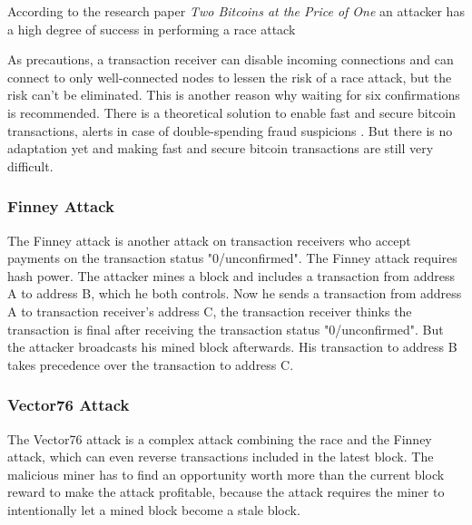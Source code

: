 According to the research paper \textit{Two Bitcoins at the Price of One} \cite{Karame12twobitcoins} an attacker has a high degree of success in performing a race attack 

As precautions, a transaction receiver can disable incoming connections and can connect to only well-connected nodes to lessen the risk of a race attack, but the risk can't be eliminated. This is another reason why waiting for six confirmations is recommended. There is a theoretical solution to enable fast and secure bitcoin transactions, alerts in case of double-spending fraud suspicions \cite{Karame12twobitcoins}. But there is no adaptation yet and making fast and secure bitcoin transactions are still very difficult.

\subsubsection{Finney Attack\label{subsubsection:finneyAttack}}
The Finney attack is another attack on transaction receivers who accept payments on the transaction status "0/unconfirmed". The Finney attack requires hash power. The attacker mines a block and includes a transaction from address A to address B, which he both controls. Now he sends a transaction from address A to transaction receiver's address C, the transaction receiver thinks the transaction is final after receiving the transaction status "0/unconfirmed". But the attacker broadcasts his mined block afterwards. His transaction to address B takes precedence over the transaction to address C. 

\subsubsection{Vector76 Attack\label{subsubsection:vector76Attack}}
The Vector76 attack is a complex attack combining the race and the Finney attack, which can even reverse transactions included in the latest block. The malicious miner has to find an opportunity worth more than the current block reward to make the attack profitable, because the attack requires the miner to intentionally let a mined block become a stale block.

